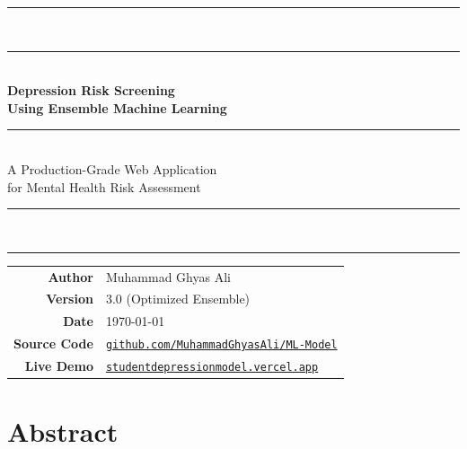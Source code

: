 \documentclass[11pt,a4paper]{article}
\begin{document}
\thispagestyle{empty}
\begin{center}
\vspace*{3.5cm}

{\color{navy}\rule{0.7\textwidth}{0.8pt}}\\[0.25cm]
{\color{gold}\rule{0.7\textwidth}{1.2pt}}\\[2cm]

{\fontsize{30}{36}\selectfont\bfseries\color{darknavy}
Depression Risk Screening\\[0.2em]
Using Ensemble Machine Learning}

{\color{gold}\rule{0.45\textwidth}{0.5pt}}\\[1.2em]

{\Large\color{darknavy!70} A Production-Grade Web Application\\[0.15em]
for Mental Health Risk Assessment}\\[2.2cm]

{\color{navy}\rule{0.7\textwidth}{1.2pt}}\\[0.25cm]
{\color{gold}\rule{0.7\textwidth}{0.8pt}}

\vfill

\begin{minipage}{0.6\textwidth}
\centering
\renewcommand{\arraystretch}{1.35}
\begin{tabular}{rl}
\textbf{Author}          & Muhammad Ghyas Ali \\[0.3em]
\textbf{Version}         & 3.0 (Optimized Ensemble) \\[0.3em]
\textbf{Date}            & \today \\[0.3em]
\textbf{Source Code}     & \href{https://github.com/MuhammadGhyasAli/ML-Model}{\texttt{github.com/MuhammadGhyasAli/ML-Model}} \\[0.3em]
\textbf{Live Demo}       & \href{https://studentdepressionmodel.vercel.app}{\texttt{studentdepressionmodel.vercel.app}} \\
\end{tabular}
\end{minipage}

\vspace{2.5cm}
\end{center}
\restoregeometry

\newpage
\section*{Abstract}
\end{document}

